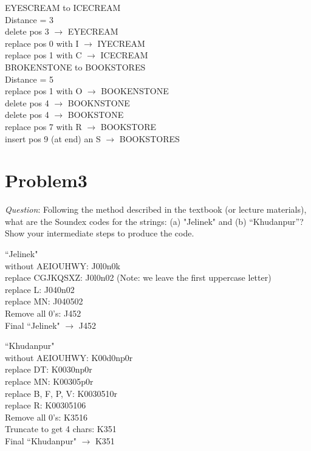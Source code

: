 \documentclass{article}
\begin{document}
EYESCREAM to ICECREAM \\
Distance = 3 \\
delete pos 3 $\rightarrow$  EYECREAM \\
replace pos 0 with I $\rightarrow$ IYECREAM \\
replace pos 1 with C $\rightarrow$ ICECREAM \\


BROKENSTONE to BOOKSTORES \\
Distance = 5 \\
replace pos 1 with O $\rightarrow$ BOOKENSTONE  \\
delete pos  4 $\rightarrow$  BOOKNSTONE \\
delete pos  4 $\rightarrow$  BOOKSTONE \\
replace pos 7 with R $\rightarrow$  BOOKSTORE \\
insert pos 9 (at end) an S $\rightarrow$  BOOKSTORES \\


\section{Problem3}
\textit{Question}: Following the method described in the textbook (or lecture materials), what are the Soundex codes for the
strings: (a) "Jelinek" and (b) “Khudanpur”? Show your intermediate steps to produce the code.
\newline 

``Jelinek" \\ 
without AEIOUHWY: J0l0n0k \\
replace CGJKQSXZ: J0l0n02 (Note: we leave the first uppercase letter)\\
replace L: J040n02 \\ 
replace MN: J040502 \\
Remove all 0's: J452 \\
Final ``Jelinek" $\rightarrow$ J452
\newline

``Khudanpur" \\
without AEIOUHWY: K00d0np0r \\
replace DT: K0030np0r \\
replace MN: K00305p0r \\
replace B, F, P, V: K0030510r \\
replace R: K00305106 \\
Remove all 0's: K3516 \\
Truncate to get 4 chars: K351 \\
Final ``Khudanpur" $\rightarrow$ K351 \\
\end{document}
